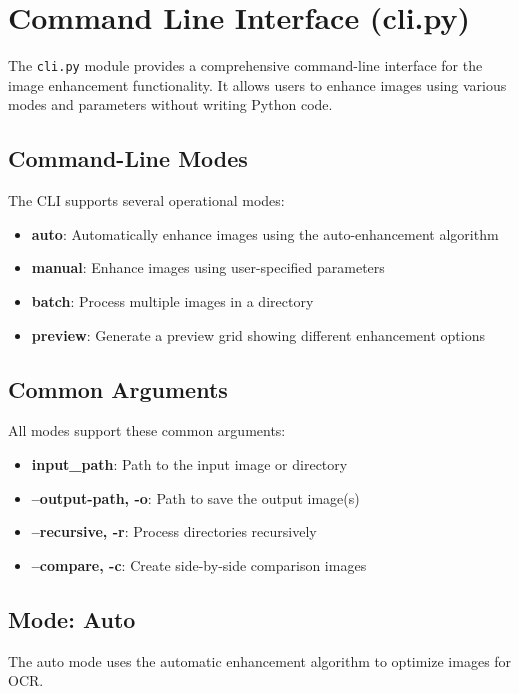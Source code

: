 \section{Command Line Interface (cli.py)}

The \texttt{cli.py} module provides a comprehensive command-line interface for the image enhancement functionality. It allows users to enhance images using various modes and parameters without writing Python code.

\subsection{Command-Line Modes}

The CLI supports several operational modes:

\begin{itemize}
  \item \textbf{auto}: Automatically enhance images using the auto-enhancement algorithm
  \item \textbf{manual}: Enhance images using user-specified parameters
  \item \textbf{batch}: Process multiple images in a directory
  \item \textbf{preview}: Generate a preview grid showing different enhancement options
\end{itemize}

\subsection{Common Arguments}

All modes support these common arguments:

\begin{itemize}
  \item \textbf{input\_path}: Path to the input image or directory
  \item \textbf{--output-path, -o}: Path to save the output image(s)
  \item \textbf{--recursive, -r}: Process directories recursively
  \item \textbf{--compare, -c}: Create side-by-side comparison images
\end{itemize}

\subsection{Mode: Auto}

The auto mode uses the automatic enhancement algorithm to optimize images for OCR.

